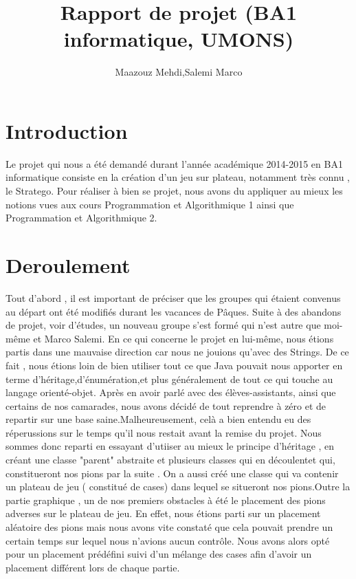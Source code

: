 \documentclass[10pt]{article}
\title{Rapport de projet (BA1 informatique, UMONS)}
\author{Maazouz Mehdi,Salemi Marco}
\begin{document}
\maketitle
\tableofcontents
\newpage

\section{Introduction}

Le projet qui nous a été demandé durant l'année académique 2014-2015 en BA1 informatique consiste en la création d'un jeu sur plateau, notamment très connu , le Stratego. Pour réaliser à bien se projet, nous avons du appliquer au mieux les notions vues aux cours Programmation et Algorithmique 1 ainsi que Programmation et Algorithmique 2.

\section{Deroulement}

Tout d'abord , il est important de préciser que les groupes qui étaient convenus au départ ont été modifiés durant les vacances de Pâques.
Suite à des abandons de projet, voir d'études, un nouveau groupe s'est formé qui n'est autre que moi-même et Marco Salemi.
En ce qui concerne le projet en lui-même, nous étions partis dans une mauvaise direction car nous ne jouions qu'avec des Strings.
De ce fait , nous étions loin de bien utiliser tout ce que Java pouvait nous apporter en terme d'héritage,d'énumération,et plus généralement de tout ce qui touche au langage orienté-objet.
Après en avoir parlé avec des élèves-assistants, ainsi que certains de nos camarades, nous avons décidé de tout reprendre à zéro et de repartir sur une base saine.Malheureusement, celà a bien entendu eu des réperussions sur le temps qu'il nous restait avant la remise du projet.
Nous sommes donc reparti en essayant d'utiiser au mieux le principe d'héritage , en créant une classe "parent" abstraite et plusieurs classes qui en découlentet qui, constitueront nos pions par la suite . On a aussi créé une classe qui va contenir un plateau de jeu ( constitué de cases) dans lequel se situeront nos pions.Outre la partie graphique , un de nos premiers obstacles à été le placement des pions adverses sur le plateau de jeu. En effet, nous étions parti sur un placement aléatoire des pions mais nous avons vite constaté que cela pouvait prendre un certain temps sur lequel nous n'avions aucun contrôle. Nous avons alors opté pour un placement prédéfini suivi d'un mélange des cases afin d'avoir un placement différent lors de chaque partie.
\end{document}
